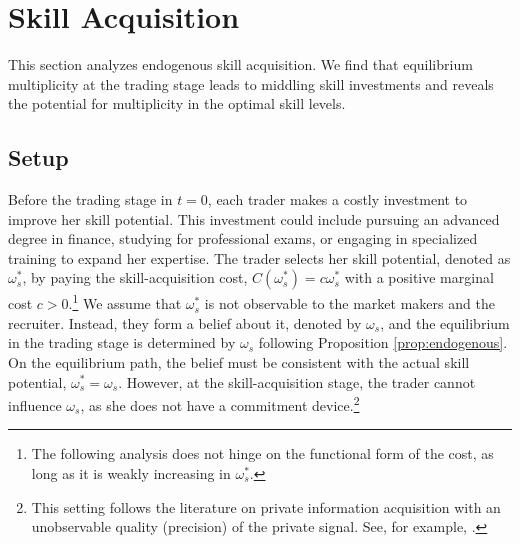 \section{Skill Acquisition}\label{sec:skillacquisition}

This section analyzes endogenous skill acquisition. We find that equilibrium multiplicity at the trading stage leads to middling skill investments and reveals the potential for multiplicity in the optimal skill levels.

\subsection{Setup}
Before the trading stage in $t=0$, each trader makes a costly investment to improve her skill potential. This investment could include pursuing an advanced degree in finance, studying for professional exams, or engaging in specialized training to expand her expertise. The trader selects her skill potential, denoted as $\omega_{s}^{*}$, by paying the skill-acquisition cost, $C(\omega_{s}^*) = c\omega_{s}^{*}$ with a positive marginal cost $c>0$.\footnote{The following analysis does not hinge on the functional form of the cost, as long as it is weakly increasing in $\omega_{s}^{*}$.} We assume that $\omega_{s}^{*}$ is not observable to the market makers and the recruiter. Instead, they form a belief about it, denoted by $\omega_{s}$, and the equilibrium in the trading stage is determined by $\omega_{s}$ following Proposition \ref{prop:endogenous}. On the equilibrium path, the belief must be consistent with the actual skill potential, $\omega_{s}^{*} = \omega_{s}$. However, at the skill-acquisition stage, the trader cannot influence $\omega_{s}$, as she does not have a commitment device.\footnote{This setting follows the literature on private information acquisition with an unobservable quality (precision) of the private signal. See, for example, \citet{xiong2023secret}.}

